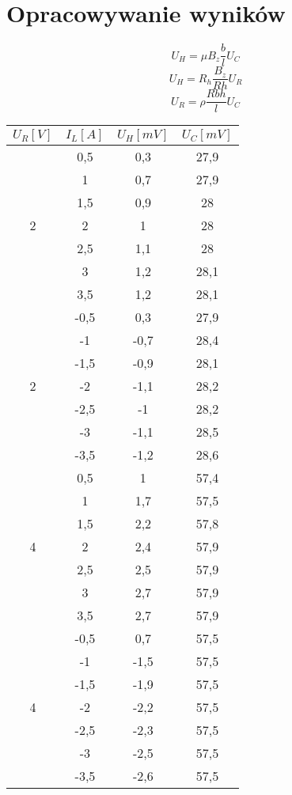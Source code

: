 \documentclass[11pt]{article}
\author{Łukasz Dubiel}
\begin{document}
\section{Opracowywanie wyników}

$$ U_H = \mu B_z \frac{b}{l} U_C $$
$$ U_H = R_h \frac{B_z}{Rh} U_R $$
$$ U_R = \rho \frac{Rbh}{l} U_C $$

\newpage

\begin{multicols}{2}

\begin{tabular}{|c|c|c|c|}
\hline
$U_R[V]$ & $I_L[A]$ & $U_H[mV]$ & $U_C[mV]$ \\
\hline
\multirow{7}{*}{2} & 0,5 & 0,3 & 27,9 \\
& 1   & 0,7 & 27,9 \\
& 1,5 & 0,9 & 28 \\
& 2   & 1 & 28 \\
& 2,5 & 1,1 & 28 \\
& 3   & 1,2 & 28,1 \\
& 3,5 & 1,2 & 28,1 \\
\hline
\multirow{7}{*}{2} & -0,5 & 0,3 & 27,9 \\
& -1   & -0,7 & 28,4 \\
& -1,5 & -0,9 & 28,1 \\
& -2   & -1,1 & 28,2 \\
& -2,5 & -1 & 28,2 \\
& -3   & -1,1 & 28,5 \\
& -3,5 & -1,2 & 28,6 \\
\hline

\multirow{7}{*}{4} & 0,5 & 1 & 57,4 \\
& 1   & 1,7 & 57,5 \\
& 1,5 & 2,2 & 57,8 \\
& 2   & 2,4 & 57,9 \\
& 2,5 & 2,5 & 57,9 \\
& 3   & 2,7 & 57,9 \\
& 3,5 & 2,7 & 57,9 \\
\hline
\multirow{7}{*}{4} & -0,5 & 0,7 & 57,5 \\
& -1   & -1,5 & 57,5 \\
& -1,5 & -1,9 & 57,5 \\
& -2   & -2,2 & 57,5 \\
& -2,5 & -2,3 & 57,5 \\
& -3   & -2,5 & 57,5 \\
& -3,5 & -2,6 & 57,5 \\
\hline


\end{tabular}
\end{multicols}
\end{document}
